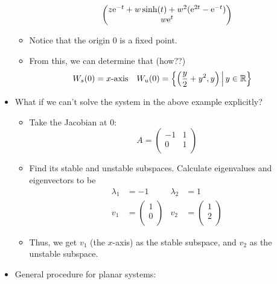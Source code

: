 \documentclass[../notes.tex]{subfiles}
\begin{document}
\begin{itemize}
\begin{itemize}
\begin{equation*}
\begin{pmatrix}
                z\e[-t]+w\sinh(t)+w^2(\e[2t]-\e[-t])\\
                w\e[t]\\
            \end{pmatrix}
        \end{equation*}
        \item Notice that the origin 0 is a fixed point.
        \item From this, we can determine that (how??)
        \begin{align*}
            W_s(0) &= x\text{-axis}&
            W_u(0) &= \left\{ \left( \frac{y}{2}+y^2,y \right) \,\middle|\, y\in\R \right\}
        \end{align*}
    \end{itemize}
    \item What if we can't solve the system in the above example explicitly?
    \begin{itemize}
        \item Take the Jacobian at 0:
        \begin{equation*}
            A =
            \begin{pmatrix}
                -1 & 1\\
                0 & 1\\
            \end{pmatrix}
        \end{equation*}
        \item Find its stable and unstable subspaces. Calculate eigenvalues and eigenvectors to be
        \begin{align*}
            \lambda_1 &= -1&
                \lambda_2 &= 1\\
            v_1 &=
            \begin{pmatrix}
                1\\
                0\\
            \end{pmatrix}&
                v_2 &=
                \begin{pmatrix}
                    1\\
                    2\\
                \end{pmatrix}
        \end{align*}
        \item Thus, we get $v_1$ (the $x$-axis) as the stable subspace, and $v_2$ as the unstable subspace.
    \end{itemize}
    \item General procedure for planar systems:

\end{itemize}
\end{document}
